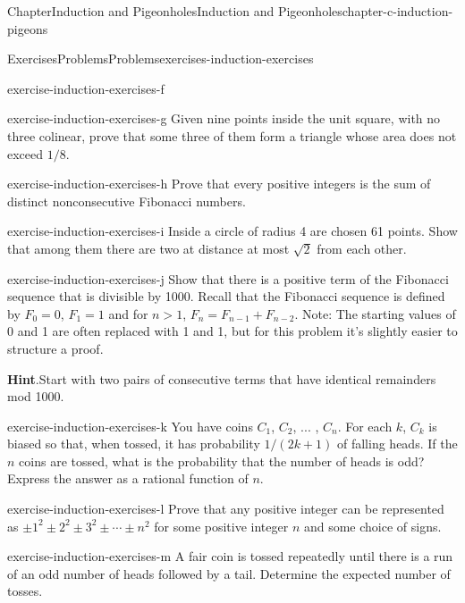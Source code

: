 \documentclass[oneside,10pt,]{book}
\newcommand{\blocktitlefont}{\relax}
\numberwithin{equation}{section}
\begin{document}
\begin{chapterptx}{Chapter}{Induction and Pigeonholes}{}{Induction and Pigeonholes}{}{}{chapter-c-induction-pigeons}
\begin{exercises-section}{Exercises}{Problems}{}{Problems}{}{}{exercises-induction-exercises}
\begin{divisionexercise}{5}{}{}{exercise-induction-exercises-f}
\end{divisionexercise}%
\begin{divisionexercise}{6}{}{}{exercise-induction-exercises-g}%
Given nine points inside the unit square, with no three colinear, prove that some three of them form a triangle whose area does not exceed \(1/8\).%
\end{divisionexercise}%
\begin{divisionexercise}{7}{}{}{exercise-induction-exercises-h}%
Prove that every positive integers is the sum of distinct nonconsecutive Fibonacci numbers.%
\end{divisionexercise}%
\begin{divisionexercise}{8}{}{}{exercise-induction-exercises-i}%
Inside a circle of radius 4 are chosen 61 points. Show that among them there are two at distance at most \(\sqrt{2}\) from each other.%
\end{divisionexercise}%
\begin{divisionexercise}{9}{}{}{exercise-induction-exercises-j}%
Show that there is a positive term of the Fibonacci sequence that is divisible by 1000. Recall that the Fibonacci sequence is defined by \(F_0=0\), \(F_1= 1\) and for \(n>1\), \(F_n= F_{n-1}+F_{n-2}\). Note: The starting values of 0 and 1 are often replaced with 1 and 1, but for this problem it's slightly easier to structure a proof.%
\par\smallskip%
\noindent\textbf{\blocktitlefont Hint}.\hypertarget{hint-induction-exercises-j-b}{}\quad{}Start with two pairs of consecutive terms that have identical remainders mod 1000.%
\end{divisionexercise}%
\begin{divisionexercise}{10}{}{}{exercise-induction-exercises-k}%
You have coins \(C_1\), \(C_2\), ... , \(C_n\). For each \(k\), \(C_k\) is biased so that, when tossed, it has probability \(1/(2k + 1)\) of falling heads. If the \(n\) coins are tossed, what is the probability that the number of heads is odd? Express the answer as a rational function of \(n\).%
\end{divisionexercise}%
\begin{divisionexercise}{11}{}{}{exercise-induction-exercises-l}%
Prove that any positive integer can be represented as \(\pm 1^2\pm 2^2\pm 3^2\pm \cdots \pm n^2\) for some positive integer \(n\) and some choice of signs.%
\end{divisionexercise}%
\begin{divisionexercise}{12}{}{}{exercise-induction-exercises-m}%
A fair coin is tossed repeatedly until there is a run of an odd number of heads followed by a tail. Determine the expected number of tosses.%

\end{divisionexercise}
\end{exercises-section}
\end{chapterptx}
\end{document}

